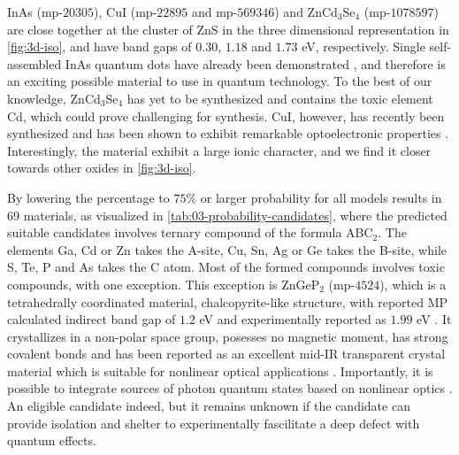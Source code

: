 
InAs (mp-$20305$), CuI (mp-$22895$ and mp-$569346$) and ZnCd$_3$Se$_4$ (mp-$1078597$) are close together at the cluster of ZnS in the three dimensional representation in \autoref{fig:3d-iso}, and have band gaps of $0.30$, $1.18$ and $1.73$ eV, respectively. Single self-assembled InAs quantum dots have already been demonstrated \cite{Liu2018}, and therefore is an exciting possible material to use in quantum technology. To the best of our knowledge, ZnCd$_3$Se$_4$ has yet to be synthesized and contains the toxic element Cd, which could prove challenging for synthesis. CuI, however, has recently been synthesized and has been shown to exhibit remarkable optoelectronic properties \cite{Ahn2020}. Interestingly, the material exhibit a large ionic character, and we find it closer towards other oxides in \autoref{fig:3d-iso}.

By lowering the percentage to $75\%$ or larger probability for all models results in $69$ materials, as visualized in \autoref{tab:03-probability-candidates}, where the predicted suitable candidates involves ternary compound of the formula ABC$_2$. The elements Ga, Cd or Zn takes the A-site, Cu, Sn, Ag or Ge takes the B-site, while S, Te, P and As takes the C atom. Most of the formed compounds involves toxic compounds, with one exception. This exception is ZnGeP$_2$ (mp-$4524$), which is a tetrahedrally coordinated material, chalcopyrite-like structure, with reported MP calculated indirect band gap of $1.2$ eV \cite{Zhang2015} and experimentally reported as $1.99$ eV \cite{Xing1989}.
It crystallizes in a non-polar space group, posesses no magnetic moment, has strong covalent bonds and has been reported as an excellent mid-IR transparent crystal material which is suitable for nonlinear optical applications \cite{Zhang2015}. Importantly, it is possible to integrate sources of photon quantum states based on nonlinear optics \cite{Caspani2017}. An eligible candidate indeed, but it remains unknown if the candidate can provide isolation and shelter to experimentally fascilitate a deep defect with quantum effects.




